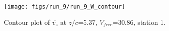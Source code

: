 \begin{figure}[H]
\centering
\texttt{[image: figs/run\_9/run\_9\_W\_contour]}
\caption{Contour plot of $\overline{v_{z}}$ at $z/c$=5.37, $V_{free}$=30.86, station 1.}
\label{fig:run_9_W_contour}
\end{figure}


